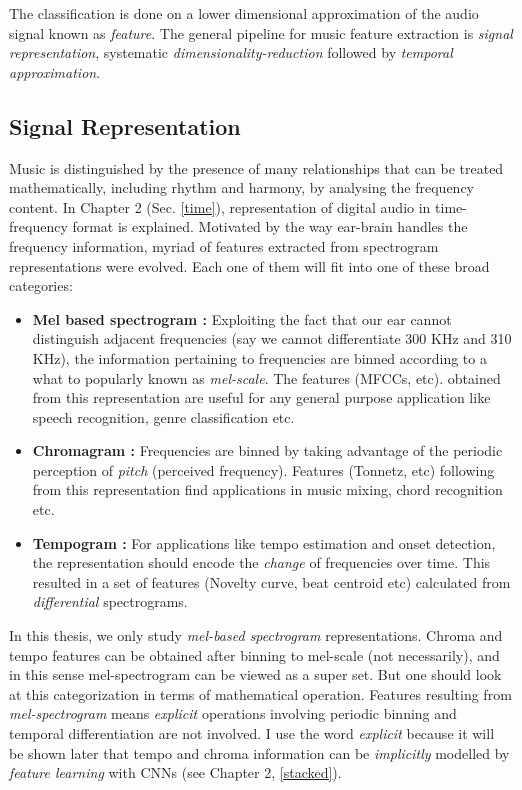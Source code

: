 \noindent The classification is done on a lower dimensional approximation of the audio signal known as \textit{feature}. The general pipeline for music feature extraction is \textit{signal representation}, systematic \textit{dimensionality-reduction} followed by \textit{temporal approximation}.
  
\subsection{Signal Representation}
Music is distinguished by the presence of many relationships that can be treated mathematically, including rhythm and harmony, by analysing the frequency content. In Chapter 2 (Sec. \ref{time}), representation of digital audio in time-frequency format is explained. Motivated by the way ear-brain handles the frequency information, myriad of features extracted from spectrogram representations were evolved. Each one of them will fit into one of these broad categories:
\begin{itemize}
\setlength\itemsep{0em}
\item \textbf{Mel based spectrogram :} Exploiting the fact that our ear cannot distinguish adjacent frequencies (say we cannot differentiate 300 KHz and 310 KHz), the information pertaining to frequencies are binned according to a what to popularly known as \textit{mel-scale}. The features (MFCCs, etc). obtained from this representation are useful for any general purpose application like speech recognition, genre classification etc.    
\item \textbf{Chromagram :} Frequencies are binned by taking advantage of the periodic perception of \textit{pitch} (perceived frequency). Features (Tonnetz, etc) following from this representation find applications in music mixing, chord recognition etc. 
\item \textbf{Tempogram :} For applications like tempo estimation and onset detection, the representation should encode the \textit{change} of frequencies over time. This resulted in a set of features (Novelty curve, beat centroid etc) calculated from \textit{differential} spectrograms.  
\end{itemize} 
In this thesis, we only study \textit{mel-based spectrogram} representations. Chroma and tempo features can be obtained after binning to mel-scale (not necessarily), and in this sense mel-spectrogram can be viewed as a super set. But one should look at this categorization in terms of mathematical operation. Features resulting from \textit{mel-spectrogram} means \textit{explicit} operations involving periodic binning and temporal differentiation are not involved. I use the word \textit{explicit} because it will be shown later that tempo and chroma information can be \textit{implicitly} modelled by \textit{feature learning} with CNNs (see Chapter 2, \ref{stacked}).     
  
